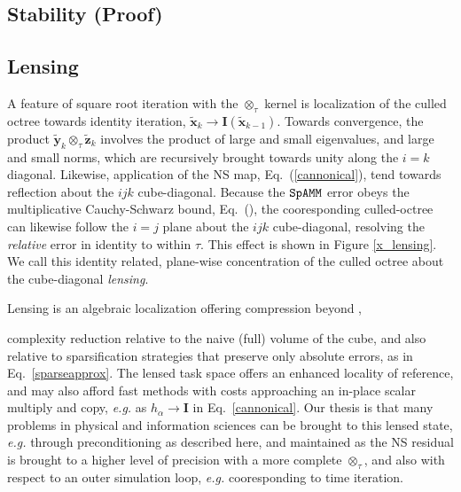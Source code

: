 \documentclass[letterpaper,twocolumn,amsmath,amsfont,amssymb,english,aps,jcp,preprintnumbers,groupaddress,nofootinbib,tightenlines]{revtex4}
\newcommand{\mat}[1]{\boldsymbol{#1}}
\newcommand{\ot}{ {\scriptstyle \otimes}_{ \tau } }
\begin{document}
\subsection{Stability (Proof)}


\subsection{Lensing}
A feature of square root iteration with the $\ot$ kernel is localization of the culled octree towards identity iteration,
$\widetilde{\mat{x}}_k \rightarrow \mat{I}\left( \widetilde{\mat{x}}_{k-1} \right)$.  Towards convergence,
the product $\widetilde{\mat{y}}_k \ot \widetilde{\mat{z}}_k$ involves the product of large and small eigenvalues, and large and small norms,
which are recursively brought towards unity along the $i=k$ diagonal.  Likewise, application of the NS map, Eq.~(\ref{cannonical}),  tend towards
reflection about the $ijk$ cube-diagonal.   Because the $\tt SpAMM$ error obeys the multiplicative Cauchy-Schwarz bound, Eq.~(),  the
cooresponding culled-octree can likewise follow the $i=j$ plane about the $ijk$ cube-diagonal, resolving the {\em relative} error in identity to within $\tau$.    This effect is shown in Figure \ref{x_lensing}.
We call this identity related,  plane-wise concentration of the culled octree  about the cube-diagonal {\em lensing}.

Lensing is an algebraic localization offering compression beyond  ,

complexity reduction relative to the naive (full) volume of the cube,
and also relative to sparsification strategies that preserve only absolute errors, as in Eq.~\ref{sparseapprox}.
The lensed task space offers an enhanced locality of reference, and may also afford fast methods
with costs approaching an in-place scalar multiply and copy, {\em e.g.} as $h_\alpha \rightarrow \mat{I}$ in Eq.~\ref{cannonical}.
Our thesis is that many problems in physical and information sciences can be brought to this lensed state, {\em e.g.} through preconditioning
as described here, and maintained as the NS residual is brought to a higher level of precision with a more complete $\ot$,
and also with respect to an outer simulation loop, {\em e.g.} cooresponding to time iteration.
\end{document}
